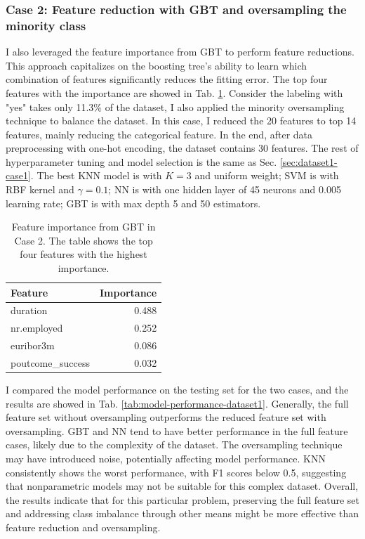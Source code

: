 \documentclass[conference]{IEEEtran}
\begin{document}
\subsubsection{Case 2: Feature reduction with GBT and oversampling the minority class \label{sec: dataset1-feature-reduction}}

I also leveraged the feature importance from GBT to perform feature reductions. This approach capitalizes on the boosting tree's ability to learn which combination of features significantly reduces the fitting error. The top four features with the importance are showed in Tab. \ref{tab:feature_importance}. Consider the labeling with "yes" takes only 11.3\% of the dataset, I also applied the minority oversampling technique to balance the dataset. In this case, I reduced the 20 features to top 14 features, mainly reducing the categorical feature. In the end, after data preprocessing with one-hot encoding, the dataset contains 30 features. The rest of hyperparameter tuning and model selection is the same as Sec. \ref{sec:dataset1-case1}. The best KNN model is with $K=3$ and uniform weight; SVM is with RBF kernel and $\gamma=0.1$; NN is with one hidden layer of 45 neurons and 0.005 learning rate; GBT is with max depth 5 and 50 estimators.
\begin{table}[htbp]
    \caption{Feature importance from GBT in Case 2. The table shows the top four features with the highest importance.}
    \begin{center}
    \begin{tabular}{|l|r|}
    \hline
    \textbf{Feature} & \textbf{Importance} \\
    \hline
    duration & 0.488 \\
    \hline
    nr.employed & 0.252 \\
    \hline
    euribor3m & 0.086 \\
    \hline
    poutcome\_success & 0.032 \\
    \hline
    \end{tabular}
    \label{tab:feature_importance}
    \end{center}
\end{table}

I compared the model performance on the testing set for the two cases, and the results are showed in Tab. \ref{tab:model-performance-dataset1}.  Generally, the full feature set without oversampling outperforms the reduced feature set with oversampling. GBT and NN tend to have better performance in the full feature cases, likely due to the complexity of the dataset. The oversampling technique may have introduced noise, potentially affecting model performance. KNN consistently shows the worst performance, with F1 scores below 0.5, suggesting that nonparametric models may not be suitable for this complex dataset. Overall, the results indicate that for this particular problem, preserving the full feature set and addressing class imbalance through other means might be more effective than feature reduction and oversampling.
\end{document}

